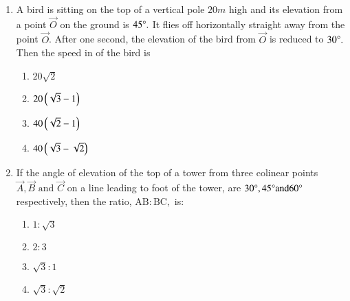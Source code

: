 \begin{enumerate}[label=\thesubsection.\arabic*,ref=\thesubsection.\theenumi]
\hfill{}
\begin{multicols}{4}
\begin{enumerate}
        \item $\frac{7\sqrt{3}}{2}\frac{1}{\sqrt{3}-1}m$          
        \item $\frac{7\sqrt{3}}{2}\brak{\sqrt{3}+1}m$ 
        \item $\frac{7\sqrt{3}}{2}\brak{\sqrt{3}-1}m$ 
        \item $\frac{7\sqrt{3}}{2}\frac{1}{\sqrt{3}+1}m$
\end{enumerate}
\end{multicols} 
\item A bird is sitting on the top of a vertical pole $20m$ high and its elevation from a point $\vec{O}$ on the  ground is $45\degree.$ It flies off horizontally straight away from the point $\vec{O}$. After one second, the elevation of the bird from $\vec{O}$ is reduced to $30\degree.$ Then the speed in  of the bird is \hfill{}
\begin{multicols}{4}
\begin{enumerate}
        \item $20\sqrt{2}$                    
        \item $20\left(\sqrt{3}-1\right)$ 
        \item $40\left(\sqrt{2}-1\right)$ 
        \item $40\left(\sqrt{3}-\sqrt{2}\right)$
\end{enumerate}
\end{multicols} 

\item If the angle of elevation of the top of a tower from three colinear points $\vec{A},\vec{B}\text{ and }\vec{C}$ on a line leading to foot of the tower, are $30\degree,45\degree \text{and}  60\degree$ respectively, then the ratio, $\text{AB}:\text{BC},$ is: 
\hfill{}
\begin{multicols}{4}
\begin{enumerate}
        \item $1:\sqrt{3}$                    
        \item $2:3$ 
        \item $\sqrt{3}:1$ 
        \item $\sqrt{3}:\sqrt{2}$
\end{enumerate}
\end{multicols} 


\end{enumerate}

